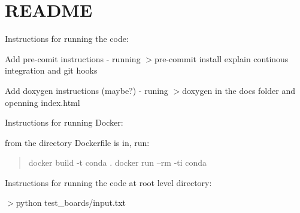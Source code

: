 \chapter{README}
\hypertarget{md__2_users_2mertdaloglu_2_desktop_2_course_work_2_r_c__coursework_2smd89_2_r_e_a_d_m_e}{}\label{md__2_users_2mertdaloglu_2_desktop_2_course_work_2_r_c__coursework_2smd89_2_r_e_a_d_m_e}
Instructions for running the code\+:
\begin{DoxyItemize}
\item Add pre-\/comit instructions -\/ running \texorpdfstring{$>$}{>}pre-\/commit install explain continous integration and git hooks
\item Add doxygen instructions (maybe?) -\/ runing \texorpdfstring{$>$}{>}doxygen in the docs folder and openning index.\+html
\end{DoxyItemize}

Instructions for running Docker\+:
\begin{DoxyItemize}
\item from the directory Dockerfile is in, run\+:
\end{DoxyItemize}

\begin{quote}
docker build -\/t conda . docker run --rm -\/ti conda \end{quote}
Instructions for running the code at root level directory\+:

\texorpdfstring{$>$}{>}python  test\+\_\+boards/input.\+txt
